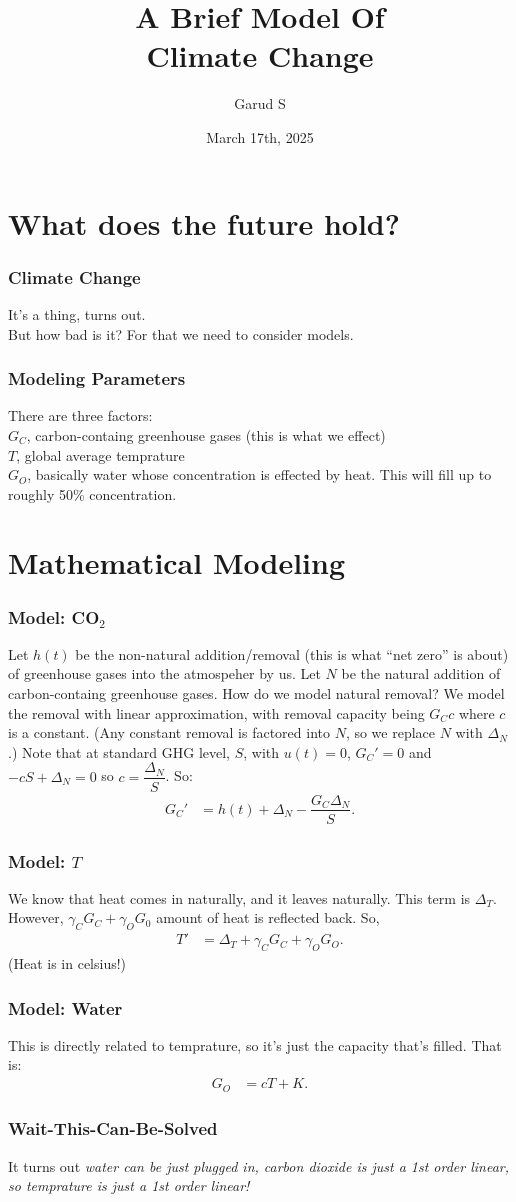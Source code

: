 \documentclass{beamer}
\title[Climate Change Differential Equations]{\normalsize A Brief Model Of \\
\Huge Climate Change}
\author{Garud S}
\date{March 17th, 2025}
\begin{document}
\frame{\titlepage}
\section{What does the future hold?}
    \begin{frame}\frametitle{Climate Change}
        It's a thing, turns out. \\
        But how bad is it? For that we need to consider models. \\
    \end{frame}
    \begin{frame}\frametitle{Modeling Parameters}
        There are three factors: \\
        $G_C$, carbon-containg greenhouse gases (this is what we effect) \\
        $T$, global average temprature \\ 
        $G_O$, basically water whose concentration is effected by heat. This will fill up to roughly 50\% concentration.
    \end{frame}
\section{Mathematical Modeling}
    \begin{frame}\frametitle{Model: CO$_2$}
        Let $h(t)$ be the non-natural addition/removal (this is what ``net zero'' is about) of greenhouse gases into the atmospeher by us. Let $N$ be the natural addition of carbon-containg greenhouse gases. How do we model natural removal?
        We model the removal with linear approximation, with removal capacity being $G_Cc$ where $c$ is a constant. (Any constant removal is factored into $N$, 
        so we replace $N$ with $\Delta_N$.) Note that at standard GHG level, $S$, with $u(t)=0$, $G_C'=0$ and $-cS + \Delta_N=0$ so $c = \dfrac{\Delta_N}{S}$.
        So:
        \begin{align}
            G_C' &= h(t) + \Delta_N - \dfrac{G_C\Delta_N}{S}.
        \end{align}
    \end{frame}
    \begin{frame}\frametitle{Model: $T$}
        We know that heat comes in naturally, and it leaves naturally. This term is $\Delta_T$. However, $\gamma_C G_C + \gamma_O G_0$
        amount of heat is reflected back. So,
        \begin{align}
            T' &= \Delta_T + \gamma_C G_C + \gamma_O G_O.
        \end{align}
        (Heat is in celsius!)
    \end{frame}
    \begin{frame}\frametitle{Model: Water}
        This is directly related to temprature, so it's just the capacity that's filled. That is:
        \begin{align}
            G_O &= cT + K.
        \end{align}
    \end{frame}
    \begin{frame}\frametitle{Wait-This-Can-Be-Solved}
        It turns out \textit{water can be just plugged in, carbon dioxide is just a 1st order linear, 
        so temprature is just a 1st order linear!}
    \end{frame}
\end{document}
